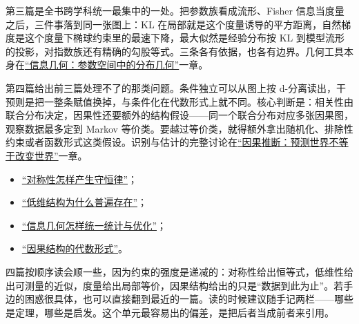 第三篇是全书跨学科统一最集中的一处。把参数族看成流形、Fisher 信息当度量之后，三件事落到同一张图上：KL 在局部就是这个度量诱导的平方距离，自然梯度是这个度量下椭球约束里的最速下降，最大似然是经验分布按 KL 到模型流形的投影，对指数族还有精确的勾股等式。三条各有依据，也各有边界。几何工具本身在\hyperref[ch:105]{``信息几何：参数空间中的分布几何''}一章。

第四篇给出前三篇处理不了的那类问题。条件独立可以从图上按 d-分离读出，干预则是把一整条赋值换掉，与条件化在代数形式上就不同。核心判断是：相关性由联合分布决定，因果性还要额外的结构假设——同一个联合分布对应多张因果图，观察数据最多定到 Markov 等价类。要越过等价类，就得额外拿出随机化、排除性约束或者函数形式这类假设。识别与估计的完整讨论在\hyperref[ch:120]{``因果推断：预测世界不等于改变世界''}一章。

\begin{itemize}
\tightlist
\item \hyperref[sec:12-Real-Analysis-Support/10-Essential-Structures/01]{``对称性怎样产生守恒律''}；
\item \hyperref[sec:12-Real-Analysis-Support/10-Essential-Structures/02]{``低维结构为什么普遍存在''}；
\item \hyperref[sec:12-Real-Analysis-Support/10-Essential-Structures/03]{``信息几何怎样统一统计与优化''}；
\item \hyperref[sec:12-Real-Analysis-Support/10-Essential-Structures/04]{``因果结构的代数形式''}。
\end{itemize}

四篇按顺序读会顺一些，因为约束的强度是递减的：对称性给出恒等式，低维性给出可测量的近似，度量给出局部等价，因果结构给出的只是``数据到此为止''。若手边的困惑很具体，也可以直接翻到最近的一篇。读的时候建议随手记两栏——哪些是定理，哪些是启发。这个单元最容易出的偏差，是把后者当成前者来引用。
